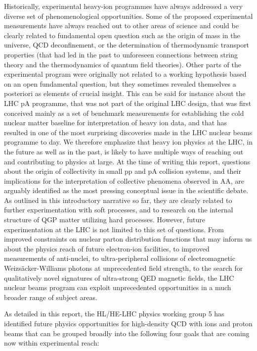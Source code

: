 \documentclass[../report.tex]{subfiles}
\begin{document}
Historically, experimental heavy-ion programmes have always addressed a very diverse set of phenomenological opportunities. Some of the proposed experimental measurements have always reached out to other areas of science and could be clearly related to fundamental open question such as the origin of mass in the universe, QCD deconfinement, or the determination of thermodynamic transport properties (that had led in the past to unforeseen connections between string theory and the thermodynamics of quantum field theories). Other parts of the experimental program were originally not related to a working hypothesis based on an open fundamental question, but they sometimes revealed themselves a posteriori as elements of crucial insight. This can be said for instance about the LHC pA programme, that was not part of the original LHC design, that was first conceived mainly as a set of benchmark measurements for establishing the cold nuclear matter baseline for interpretation of heavy ion data, and that has resulted in one of the most surprising discoveries made in the LHC nuclear beams programme to day. We therefore emphasize that heavy ion physics at the LHC, in the future as well as in the past, is likely to have multiple ways of reaching out and contributing to physics at large. At the time of writing this report, questions about the origin of collectivity in small pp and pA collision systems, and their implications for the interpretation of collective phenomena observed in AA, are arguably identified as the most pressing conceptual issue in the scientific debate. As outlined in this introductory narrative so far, they are clearly related to further experimentation with soft processes, and to research on the internal structure of QGP matter utilizing hard processes.  However, future experimentation at the LHC is not limited to this set of questions. From improved constraints on nuclear parton distribution functions that may inform us about the physics reach of future electron-ion facilities, to improved measurements of anti-nuclei, to ultra-peripheral collisions of electromagnetic Weizsäcker-Williams photons at unprecedented field strength, to the search for qualitatively novel signatures of ultra-strong QED magnetic fields, the LHC nuclear beams program can exploit unprecedented opportunities in a much broader range of subject areas. 

As detailed in this report, the HL/HE-LHC physics working group 5 has identified future physics opportunities for high-density QCD with ions and proton beams that can be grouped broadly into the following four goals that are coming now within experimental reach:
\end{document}
